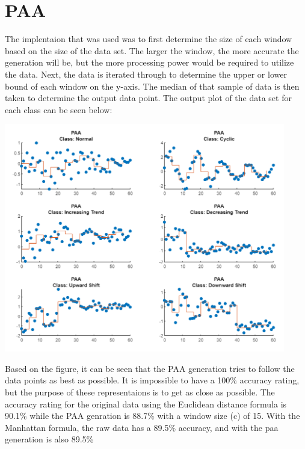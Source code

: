 \documentclass{article}
\begin{document}
\section{PAA}
The implentaion that was used was to first determine the size of each window
based on the size of the data set.  The larger the window, the more accurate
the generation will be, but the more processing power would be required to 
utilize the data.  Next, the data is iterated through to determine the upper
or lower bound of each window on the y-axis.  The median of that sample of 
data is then taken to determine the output data point.
\newline
\noindent
The output plot of the data set for each class can be seen below:
\begin{center}
{\includegraphics[height=10cm]{graphics/paaplot.png}\centering}
\end{center}

Based on the figure, it can be seen that the PAA generation tries to follow
the data points as best as possible.  It is impossible to have a 100\% accuracy 
rating, but the purpose of these representaions is to get as close as possible.
The accuracy rating for the original data using the Euclidean distance formula
is 90.1\% while the PAA genration is 88.7\% with a window size (c) of 15.  With the Manhattan formula, 
the raw data has a 89.5\% accuracy, and with the paa generation is also
89.5\%
\newline
\end{document}
